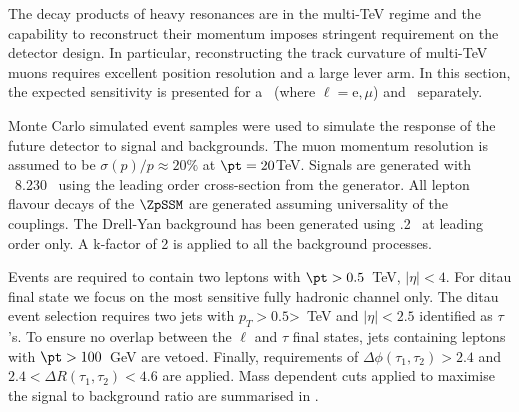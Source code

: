 The decay products of heavy resonances are in the multi-TeV regime and the capability to reconstruct their momentum imposes stringent requirement on the detector design. In particular, reconstructing the track curvature of multi-TeV muons requires excellent position resolution and a large lever arm. In this section, the expected sensitivity is presented for a \Zpll\ (where $\ell=\mathrm{e},\mu$) and \Zptata\ separately.

Monte Carlo simulated event samples were used to simulate the response of the future detector to signal and backgrounds. The muon momentum resolution is assumed to be $\sigma(p)/p \approx 20\%$ at $\pt= 20 $TeV. Signals are generated with \pythia~8.230~\cite{Sjostrand:2014zea} using the leading order cross-section from the generator.
All lepton flavour decays of the $\ZpSSM$ are generated assuming universality of the couplings.
The Drell-Yan background has been generated using .2~\cite{Alwall:2014hca} at leading order only. A k-factor of 2 is applied to all the background processes. 

Events are required to contain two leptons with $\pt > 0.5$~TeV, $|\eta|<4$. For ditau final state we focus on the most sensitive fully hadronic channel only. The ditau event selection requires two jets with $p_{T} > 0.5$>~TeV and $|\eta|<2.5$ identified as $\tau$'s. To ensure no overlap between the $\ell$ and $\tau$ final states, jets containing leptons with $\pt > 100$~GeV are vetoed. Finally, requirements of $\Delta \phi(\tau_1, \tau_2)> 2.4$ and $2.4<\Delta R(\tau_1, \tau_2)<4.6$ are applied.
Mass dependent cuts applied to maximise the signal to background ratio are summarised in .

